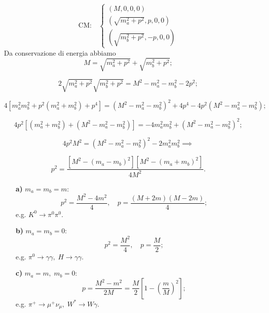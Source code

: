 \[
\text{CM:} \quad
\begin{cases}
(M, 0, 0, 0) \\
\left(\sqrt{m_a^2 + p^2}, p, 0, 0 \right) \\
\left(\sqrt{m_b^2 + p^2}, -p, 0, 0 \right)
\end{cases}
\]
Da conservazione di energia  abbiamo 
\[
M = \sqrt{m_a^2 + p^2} + \sqrt{m_b^2 + p^2};
\]

\[
2 \sqrt{m_a^2 + p^2} \sqrt{m_b^2 + p^2} = M^2 - m_a^2 - m_b^2 - 2p^2;
\]

\[
4 \left[ m_a^2 m_b^2 + p^2 \left( m_a^2 + m_b^2 \right) + p^4 \right] 
= \left( M^2 - m_a^2 - m_b^2 \right)^2 + 4 p^4 - 4p^2 \left( M^2 - m_a^2 - m_b^2 \right);
\]

\[
4p^2 \left[ \left( m_a^2 + m_b^2 \right) + \left( M^2 - m_a^2 - m_b^2 \right) \right] 
= -4m_a^2 m_b^2 + \left( M^2 - m_a^2 - m_b^2 \right)^2;
\]

\[
4p^2 M^2 = \left( M^2 - m_a^2 - m_b^2 \right)^2 - 2m_a^2 m_b^2 
\implies
\]

\[
p^2 = \frac{\left[ M^2 - (m_a - m_b)^2 \right] \left[ M^2 - (m_a + m_b)^2 \right]}{4M^2}.
\]

\begin{enumerate}
    \item[\textbf{a)}] \( m_a = m_b = m \):  
    \[
    p^2 = \frac{M^2 - 4m^2}{4}, \quad p = \frac{(M + 2m)(M - 2m)}{4};
    \]  
    e.g. \( K^0 \to \pi^0 \pi^0 \).

    \item[\textbf{b)}] \( m_a=m_b = 0 \):  
    \[
    p^2 = \frac{M^2}{4}, \quad p = \frac{M}{2};
    \]  
    e.g. \( \pi^0 \to \gamma \gamma, \; H \to \gamma \gamma \).

    \item[\textbf{c)}] \( m_a = m, \; m_b = 0 \):  
    \[
    p = \frac{M^2 - m^2}{2M} = \frac{M}{2} \left[ 1 - \left( \frac{m}{M} \right)^2 \right];
    \]  
    e.g. \( \pi^+ \to \mu^+ \nu_\mu, \; W^* \to W \gamma \).
\end{enumerate}
